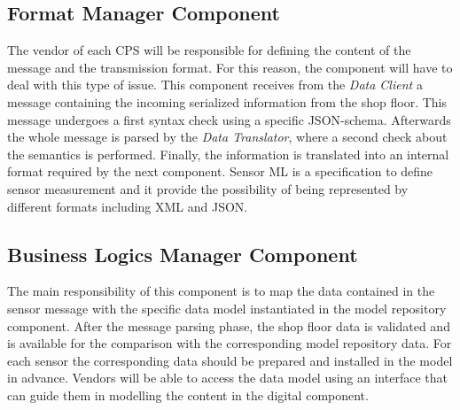\subsection{Format Manager Component}
The vendor of each CPS will be responsible for defining the content of the message and the transmission format. 
For this reason, the component will have to deal with this type of issue.
This component receives from the \textit{Data Client} a message containing the incoming serialized information from the shop floor. 
This message undergoes a first syntax check using a specific JSON-schema. 
Afterwards the whole message is parsed by the \textit{Data Translator}, where a second check about the semantics is performed. 
Finally, the information is translated into an internal format required by the next component. 
Sensor ML is a specification to define sensor measurement and it provide the possibility of being represented by different formats including XML and JSON.

\subsection{Business Logics Manager Component}
The main responsibility of this component is to map the data contained in the sensor message with the specific data model instantiated in the model repository component.
After the message parsing phase, the shop floor data is validated and is available for the comparison with the corresponding model repository data. For each sensor the corresponding data should be prepared and installed in the model in advance. Vendors will be able to access the data model using an interface that can guide them in modelling the content in the digital component.

